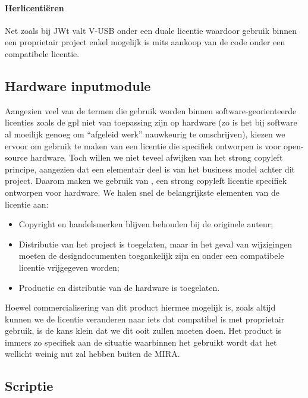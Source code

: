 \paragraph{Herlicentiëren} Net zoals bij JWt valt V-USB onder een duale licentie waardoor gebruik binnen een proprietair project enkel mogelijk is mits aankoop van de code onder een compatibele licentie.

\subsection{Hardware inputmodule}
\label{ontwerp:licenties:keuze:hardware}

Aangezien veel van de termen die gebruik worden binnen software-georienteerde licenties zoals de \ac{gpl} niet van toepassing zijn op hardware (zo is het bij software al moeilijk genoeg om ``afgeleid werk'' nauwkeurig te omschrijven), kiezen we ervoor om gebruik te maken van een licentie die specifiek ontworpen is voor open-source hardware. Toch willen we niet teveel afwijken van het strong copyleft principe, aangezien dat een elementair deel is van het business model achter dit project. Daarom maken we gebruik van , een strong copyleft licentie specifiek ontworpen voor hardware. We halen snel de belangrijkste elementen van de licentie aan:

\begin{itemize}
  \item Copyright en handelsmerken blijven behouden bij de originele auteur;
  \item Distributie van het project is toegelaten, maar in het geval van wijzigingen moeten de designdocumenten toegankelijk zijn en onder een compatibele licentie vrijgegeven worden;
  \item Productie en distributie van de hardware is toegelaten.
\end{itemize}

Hoewel commercialisering van dit product hiermee mogelijk is, zoals altijd kunnen we de licentie veranderen naar iets dat compatibel is met proprietair gebruik, is de kans klein dat we dit ooit zullen moeten doen. Het product is immers zo specifiek aan de situatie waarbinnen het gebruikt wordt dat het wellicht weinig nut zal hebben buiten de MIRA.

\subsection{Scriptie}
\label{ontwerp:licenties:keuze:scriptie}

